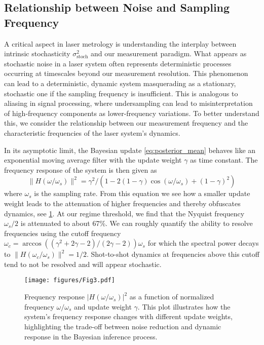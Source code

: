 \documentclass[9pt, twocolumn,superscriptaddress]{revtex4}
\begin{document}
\subsection{Relationship between Noise and Sampling Frequency}\label{sec:frequency-analysis}

A critical aspect in laser metrology is understanding the interplay between intrinsic stochasticity $\sigma^2_{\text{stoch}}$ and our measurement paradigm. What appears as stochastic noise in a laser system often represents deterministic processes occurring at timescales beyond our measurement resolution. This phenomenon can lead to a deterministic, dynamic system masquerading as a stationary, stochastic one if the sampling frequency is insufficient. This is analogous to aliasing in signal processing, where undersampling can lead to misinterpretation of high-frequency components as lower-frequency variations. To better understand this, we consider the relationship between our measurement frequency and the characteristic frequencies of the laser system's dynamics. 

In its asymptotic limit, the Bayesian update \cref{eq:posterior_mean} behaves like an exponential moving average filter with the update weight $\gamma$ as time constant. The frequency response of the system is then given as
\begin{equation}
    \| H(\omega/\omega_s) \|^2 = \gamma^2 / (1-2(1-\gamma)\cos(\omega/\omega_s)+(1-\gamma)^2)
    \label{eq:magnitude-response}
\end{equation}
where $\omega_s$ is the sampling rate. From this equation we see how a smaller update weight leads to the attenuation of higher frequencies and thereby obfuscates dynamics, see \cref{fig:magnitude_response}. At our regime threshold, we find that the Nyquist frequency $\omega_s/2$ is attenuated to about 67\%. We can roughly quantify the ability to resolve frequencies using the cutoff frequency $\omega_c = \arccos((\gamma^2+2\gamma-2)/(2\gamma-2))\omega_s$ for which the spectral power decays to $\| H(\omega_c/\omega_s) \|^2 = 1/2$. Shot-to-shot dynamics at frequencies above this cutoff tend to not be resolved and will appear stochastic. 

\begin{figure}[t]
    \centering
    \texttt{[image: figures/Fig3.pdf]}
    \caption{Frequency response $|H(\omega/\omega_s)|^2$ as a function of normalized frequency $\omega/\omega_s$ and update weight $\gamma$. This plot illustrates how the system's frequency response changes with different update weights, highlighting the trade-off between noise reduction and dynamic response in the Bayesian inference process.}
    \label{fig:magnitude_response}
\end{figure}
\end{document}
